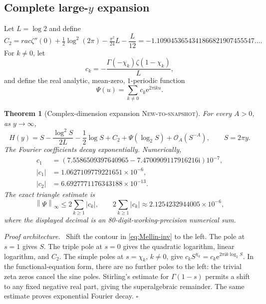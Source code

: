 \documentclass[11pt,oneside]{article}
\numberwithin{equation}{section}
\newtheorem{theorem}{Theorem}[section]
\theoremstyle{definition}
\theoremstyle{remark}
\newcommand{\ii}{\mathrm i}
\newcommand{\e}{\mathrm e}
\newcommand{\bigO}{\mathcal O}
\newcommand{\norm}[1]{\left\lVert #1\right\rVert}
\newcommand{\NewResult}{\textsc{New-to-snapshot}}
\newenvironment{proofidea}
  {\par\smallskip\noindent\textit{Proof architecture.}\ }
  {\hfill$\square$\par\smallskip}
\begin{document}
\subsection{Complete large-$y$ expansion}

Let $L=\log2$ and define
\begin{equation}
 C_2=
rac{\zeta''(0)+\tfrac12\log^2(2\pi)-\tfrac{\pi^2}{24}}{L}
     -\frac{L}{12}
 =-1.1090453654341866821907455547\ldots.                  \label{eq:C2}
\end{equation}
For $k\ne0$, let
\begin{equation}
 c_k=-\frac{\Gamma(-\chi_k)\zeta(1-\chi_k)}{L},            \label{eq:ck}
\end{equation}
and define the real analytic, mean-zero, $1$-periodic function
\begin{equation}
 \Psi(u)=\sum_{k\ne0}c_k\e^{2\pi\ii ku}.                  \label{eq:Psi}
\end{equation}

\begin{theorem}[Complex-dimension expansion \NewResult]
\label{thm:H-asymp}
For every $A>0$, as $y\to\infty$,
\begin{equation}
 \boxed{
 H(y)=S-\frac{\log^2S}{2L}-\frac12\log S+C_2
      +\Psi(\log_2S)+\bigO_A(S^{-A}),\qquad S=2\pi y.}    \label{eq:H-asymp}
\end{equation}
The Fourier coefficients decay exponentially.  Numerically,
\begin{align}
 c_1&=(7.5586509397640965-7.4700909117916216\ii)10^{-7},\nonumber\\
 |c_1|&=1.0627109779221651\times10^{-6},\nonumber\\
 |c_2|&=6.6927771176343188\times10^{-13}.                 \label{eq:cnum}
\end{align}
The exact triangle estimate is
\begin{equation}
 \norm{\Psi}_\infty\le2\sum_{k\ge1}|c_k|,
 \qquad
 2\sum_{k\ge1}|c_k|\approx2.1254232944005\times10^{-6}, \label{eq:Psi-bound}
\end{equation}
where the displayed decimal is an 80-digit-working-precision numerical sum.
\end{theorem}

\begin{proofidea}
Shift the contour in \eqref{eq:Mellin-inv} to the left.  The pole at $s=1$
gives $S$.  The triple pole at $s=0$ gives the quadratic logarithm, linear
logarithm, and $C_2$.  The simple poles at $s=\chi_k$, $k\ne0$, give
$c_kS^{\chi_k}=c_k\e^{2\pi\ii k\log_2S}$.  In the functional-equation form,
there are no further poles to the left: the trivial zeta zeros cancel the sine
poles.  Stirling's estimate for $\Gamma(1-s)$ permits a shift to any fixed
negative real part, giving the superalgebraic remainder.  The same estimate
proves exponential Fourier decay.
\end{proofidea}
\end{document}
